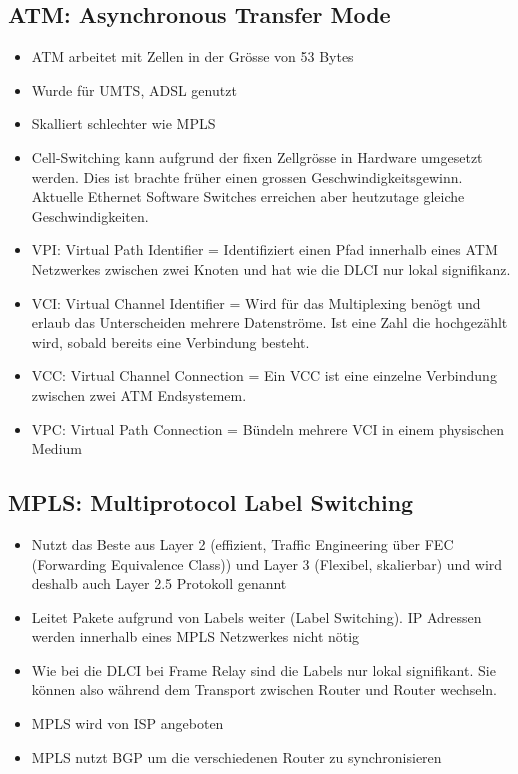 \subsection{ATM: Asynchronous Transfer Mode}
\begin{itemize}
	\item ATM arbeitet mit Zellen in der Grösse von 53 Bytes
	\item Wurde für UMTS, ADSL genutzt
	\item Skalliert schlechter wie MPLS
	\item Cell-Switching kann aufgrund der fixen Zellgrösse in Hardware umgesetzt werden. Dies ist brachte früher einen grossen Geschwindigkeitsgewinn. Aktuelle Ethernet Software Switches erreichen aber heutzutage gleiche Geschwindigkeiten.
	\item VPI: Virtual Path Identifier = Identifiziert einen Pfad innerhalb eines ATM Netzwerkes zwischen zwei Knoten und hat wie die DLCI nur lokal signifikanz.
	\item VCI: Virtual Channel Identifier = Wird für das Multiplexing benögt und erlaub das Unterscheiden mehrere Datenströme. Ist eine Zahl die hochgezählt wird, sobald bereits eine Verbindung besteht.
	\item VCC: Virtual Channel Connection =  Ein VCC ist eine einzelne Verbindung zwischen zwei ATM Endsystemem. 
	\item VPC: Virtual Path Connection = Bündeln mehrere VCI in einem physischen Medium
\end{itemize}

\subsection{MPLS: Multiprotocol Label Switching}
\begin{itemize}
	\item Nutzt das Beste aus Layer 2 (effizient, Traffic Engineering über FEC (Forwarding Equivalence Class)) und Layer 3 (Flexibel, skalierbar) und wird deshalb auch Layer 2.5 Protokoll genannt
	\item Leitet Pakete aufgrund von Labels weiter (Label Switching). IP Adressen werden innerhalb eines MPLS Netzwerkes nicht nötig
	\item Wie bei die DLCI bei Frame Relay sind die Labels nur lokal signifikant. Sie können also während dem Transport zwischen Router und Router wechseln.
	\item MPLS wird von ISP angeboten
	\item MPLS nutzt BGP um die verschiedenen Router zu synchronisieren
\end{itemize}
	
